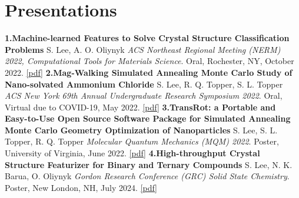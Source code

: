 \documentclass{article}%
\begin{document}
\section*{Presentations}%
\label{sec:Presentations}%
\textbf{1.Machine{-}learned Features to Solve Crystal Structure Classification Problems\newline%
}%
S. Lee, A. O. Oliynyk\newline%
%
\emph{ACS Northeast Regional Meeting (NERM) 2022, Computational Tools for Materials Science}.%
\newline%
 Oral, Rochester, NY, October 2022. %
\href{https://bobleesj.github.io/files/presentation/2022-ACS-NERM-slides.pdf}{{[}pdf{]}}%
\newline%
\newline%
%
\textbf{2.Mag{-}Walking Simulated Annealing Monte Carlo Study of Nano{-}solvated Ammonium Chloride\newline%
}%
S. Lee, R. Q. Topper, S. L. Topper\newline%
%
\emph{ACS New York 69th Annual Undergraduate Research Symposium 2022}.%
\newline%
 Oral, Virtual due to COVID{-}19, May 2022. %
\href{https://bobleesj.github.io/files/presentation/2022-ACS-NY-URS-slides.pdf}{{[}pdf{]}}%
\newline%
\newline%
%
\textbf{3.TransRot: a Portable and Easy{-}to{-}Use Open Source Software Package for Simulated Annealing Monte Carlo Geometry Optimization of Nanoparticles\newline%
}%
S. Lee, S. L. Topper, R. Q. Topper\newline%
%
\emph{Molecular Quantum Mechanics (MQM) 2022}.%
\newline%
 Poster, University of Virginia, June 2022. %
\href{https://bobleesj.github.io/files/presentation/2022-MQM-poster.pdf}{{[}pdf{]}}%
\newline%
\newline%
%
\textbf{4.High{-}throughput Crystal Structure Featurizer for Binary and Ternary Compounds\newline%
}%
S. Lee, N. K. Barua, O. Oliynyk\newline%
%
\emph{Gordon Research Conference (GRC) Solid State Chemistry}.%
\newline%
 Poster, New London, NH, July 2024. %
\href{https://bobleesj.github.io/files/presentation/2024-GRC-poster.pdf}{{[}pdf{]}}%

%
\end{document}
